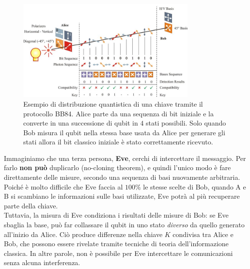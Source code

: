 \documentclass[../../InformazioneQuantistica.tex]{subfiles}
\begin{document}
\begin{figure}[H]
\centering
\includegraphics[width=0.8\textwidth]{Immagini/27_3/image005.png}
\caption{Esempio di distribuzione quantistica di una chiave tramite il protocollo BB84. Alice parte da una sequenza di bit iniziale e la converte in una successione di qubit in $4$ stati possibili. Solo quando Bob misura il qubit nella stessa base usata da Alice per generare gli stati allora il bit classico iniziale è stato correttamente ricevuto.\label{fig:quantum-bb84}}
\end{figure}

Immaginiamo che una terza persona, \textbf{Eve}, cerchi di intercettare il messaggio. Per farlo \textbf{non può} duplicarlo (no-cloning theorem), e quindi l'unico modo è fare direttamente delle misure, secondo una sequenza di basi nuovamente arbitraria. Poiché è molto difficile che Eve faccia al $100\%$ le stesse scelte di Bob, quando A e B si scambiano le informazioni sulle basi utilizzate, Eve potrà al più recuperare parte della chiave.\\
Tuttavia, la misura di Eve condiziona i risultati delle misure di Bob: se Eve sbaglia la base, può far collassare il qubit in uno stato \textit{diverso} da quello generato all'inizio da Alice. Ciò produce differenze nella chiave $K$ condivisa tra Alice e Bob, che possono essere rivelate tramite tecniche di teoria dell'informazione classica. In altre parole, non è possibile per Eve intercettare le comunicazioni senza alcuna interferenza.\\
\end{document}
